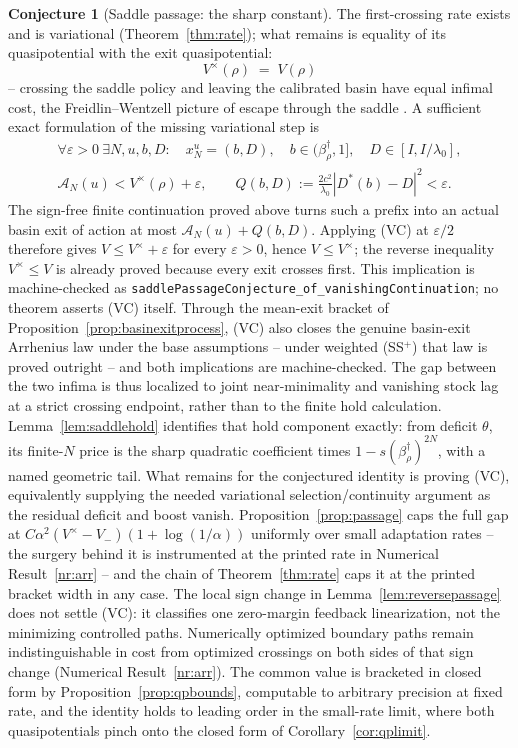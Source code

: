 \documentclass[11pt]{article}
\theoremstyle{definition}
\newtheorem{conjecture}[theorem]{Conjecture}
\theoremstyle{remark}
\numberwithin{equation}{section}
\begin{document}
\begin{conjecture}[Saddle passage: the sharp constant]\label{conj:arr}
The first-crossing rate exists and is variational (Theorem~\ref{thm:rate}); what remains is equality of its quasipotential with the exit quasipotential:
\[
V^{\times}(\rho) \;=\; V(\rho)
\]
-- crossing the saddle policy and leaving the calibrated basin have equal infimal cost, the Freidlin--Wentzell picture of escape through the saddle \citep{freidlin2012random}. A sufficient exact formulation of the missing variational step is
\[
\tag{VC}\label{eq:passage-vc}
\begin{gathered}
\forall\varepsilon>0\ \exists N,u,b,D:\quad
x_N^u=(b,D),\quad b\in(\beta^\dagger_\rho,1],\quad
D\in[I,I/\lambda_0],\\
\mathcal A_N(u)<V^\times(\rho)+\varepsilon,\qquad
Q(b,D):=\frac{2c^2}{\lambda_0}
  \left|D^\ast(b)-D\right|^2<\varepsilon .
\end{gathered}
\]
The sign-free finite continuation proved above turns such a prefix into an actual basin exit of action at most $\mathcal A_N(u)+Q(b,D)$. Applying (VC) at $\varepsilon/2$ therefore gives $V\le V^\times+\varepsilon$ for every $\varepsilon>0$, hence $V\le V^\times$; the reverse inequality $V^\times\le V$ is already proved because every exit crosses first. This implication is machine-checked as \texttt{saddlePassageConjecture\_of\_vanishingContinuation}; no theorem asserts (VC) itself. Through the mean-exit bracket of Proposition~\ref{prop:basinexitprocess}, (VC) also closes the genuine basin-exit Arrhenius law under the base assumptions -- under weighted (SS$^+$) that law is proved outright -- and both implications are machine-checked. The gap between the two infima is thus localized to joint near-minimality and vanishing stock lag at a strict crossing endpoint, rather than to the finite hold calculation. Lemma~\ref{lem:saddlehold} identifies that hold component exactly: from deficit $\theta$, its finite-$N$ price is the sharp quadratic coefficient times $1-s(\beta^\dagger_\rho)^{2N}$, with a named geometric tail. What remains for the conjectured identity is proving (VC), equivalently supplying the needed variational selection/continuity argument as the residual deficit and boost vanish. Proposition~\ref{prop:passage} caps the full gap at $C\alpha^2(V^{\times} - V_-)(1+\log(1/\alpha))$ uniformly over small adaptation rates -- the surgery behind it is instrumented at the printed rate in Numerical Result~\ref{nr:arr} -- and the chain of Theorem~\ref{thm:rate} caps it at the printed bracket width in any case. The local sign change in Lemma~\ref{lem:reversepassage} does not settle (VC): it classifies one zero-margin feedback linearization, not the minimizing controlled paths. Numerically optimized boundary paths remain indistinguishable in cost from optimized crossings on both sides of that sign change (Numerical Result~\ref{nr:arr}). The common value is bracketed in closed form by Proposition~\ref{prop:qpbounds}, computable to arbitrary precision at fixed rate, and the identity holds to leading order in the small-rate limit, where both quasipotentials pinch onto the closed form of Corollary~\ref{cor:qplimit}.
\end{conjecture}
\end{document}
